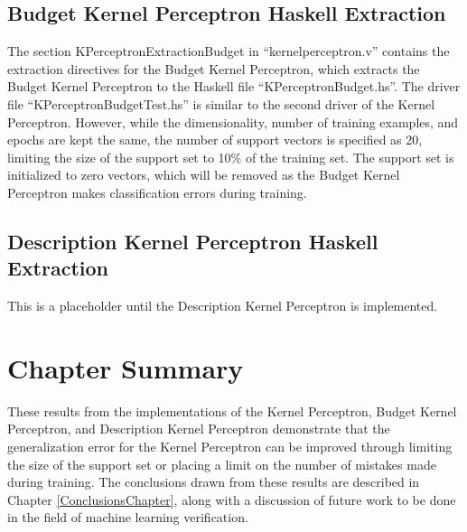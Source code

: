 \subsection{Budget Kernel Perceptron Haskell Extraction}\label{KPBHaskell}
The section KPerceptronExtractionBudget in ``kernelperceptron.v'' contains the extraction directives for the Budget Kernel Perceptron, which extracts the Budget Kernel Perceptron to the Haskell file ``KPerceptronBudget.hs''. The driver file ``KPerceptronBudgetTest.hs'' is similar to the second driver of the Kernel Perceptron. However, while the dimensionality, number of training examples, and epochs are kept the same, the number of support vectors is specified as 20, limiting the size of the support set to 10\% of the training set. The support set is initialized to zero vectors, which will be removed as the Budget Kernel Perceptron makes classification errors during training. 
\subsection{Description Kernel Perceptron Haskell Extraction}\label{KPDHaskell}
This is a placeholder until the Description Kernel Perceptron is implemented.
\section{Chapter Summary}\label{ResultsChapterSummarySection}
These results from the implementations of the Kernel Perceptron, Budget Kernel Perceptron, and Description Kernel Perceptron demonstrate that the generalization error for the Kernel Perceptron can be improved through limiting the size of the support set or placing a limit on the number of mistakes made during training. The conclusions drawn from these results are described in Chapter \ref{ConclusionsChapter}, along with a discussion of future work to be done in the field of machine learning verification.
